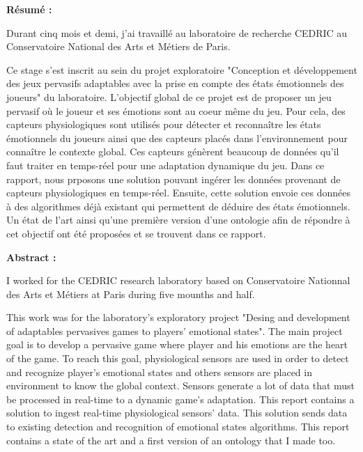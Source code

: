 \documentclass{article}
\begin{document}
\newpage
\begin{center}
	\textbf{Résumé :}
\end{center}
\hspace*{0.4cm}
Durant cinq mois et demi, j'ai travaillé au laboratoire de recherche CEDRIC au Conservatoire National des Arts et Métiers de Paris.\par
Ce stage s'est inscrit au sein du projet exploratoire "Conception et développement des jeux pervasifs adaptables avec la prise en compte des états émotionnels des joueurs" du laboratoire.
L'objectif global de ce projet est de proposer un jeu pervasif où le joueur et ses émotions sont au coeur même du jeu. 
Pour cela, des capteurs physiologiques sont utilisés pour détecter et reconnaître les états émotionnels du joueurs ainsi que des capteurs placés dans l'environnement pour connaître le contexte global. 
Ces capteurs génèrent beaucoup de données qu'il faut traiter en temps-réel pour une adaptation dynamique du jeu.
Dans ce rapport, nous prposons une solution pouvant ingérer les données provenant de capteurs physiologiques en temps-réel.
Ensuite, cette solution envoie ces données à des algorithmes déjà existant qui permettent de déduire des états émotionnels.
Un état de l'art ainsi qu'une première version d'une ontologie afin de répondre à cet objectif ont été proposées et se trouvent dans ce rapport. 
\bigskip\newline
\begin{center}
	\textbf{Abstract :}
\end{center}
\hspace*{0.4cm}
I worked for the CEDRIC research laboratory based on Conservatoire Nationnal des Arts et Métiers at Paris during five mounths and half.\par
This work was for the laboratory's exploratory project "Desing and development of adaptables pervasives games to players' emotional states".
The main project goal is to develop a pervasive game where player and his emotions are the heart of the game.
To reach this goal, physiological sensors are used in order to detect and recognize player's emotional states and others sensors are placed in environment to know the global context.
Sensors generate a lot of data that must be processed in real-time to a dynamic game's adaptation.
This report contains a solution to ingest real-time physiological sensors' data.
This solution sends data to existing detection and recognition of emotional states algorithms.
This report contains a state of the art and a first version of an ontology that I made too. 
\end{document}
